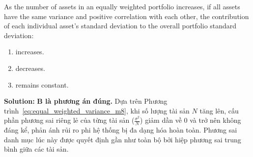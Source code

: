 \begin{tcolorbox}[
	colback=gray!5!white,
	colframe=black!15!white,
	boxrule=0.5pt,
	arc=3pt,
	title=\textbf{Question 4},
	coltitle=black,
	colbacktitle=black!5!white,
	before skip=6pt,
	after skip=6pt,
	breakable
]
As the number of assets in an equally weighted portfolio increases, if all assets have the same variance and positive correlation with each other, the contribution of each individual asset's standard deviation to the overall portfolio standard deviation:
\begin{enumerate}[label=\Alph*.]
	\item increases.
	\item decreases.
	\item remains constant.
\end{enumerate}

\textbf{Solution:}
\textbf{B là phương án đúng.} Dựa trên Phương trình~\ref{eq:equal_weighted_variance_m8}, khi số lượng tài sản $N$ tăng lên, cấu phần phương sai riêng lẻ của từng tài sản ($\frac{\sigma^2}{N}$) giảm dần về 0 và trở nên không đáng kể, phản ánh rủi ro phi hệ thống bị đa dạng hóa hoàn toàn. Phương sai danh mục lúc này được quyết định gần như toàn bộ bởi hiệp phương sai trung bình giữa các tài sản.
\end{tcolorbox}

